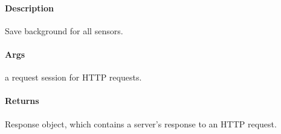 \documentclass[letterpaper,10pt,english]{sphinxmanual}
\begin{document}
\begin{fulllineitems}
\label{\detokenize{gemini_perception_API:gemini_perception_API.save_backgrounds}}
\pysigstartsignatures
{}
\pysigstopsignatures

\paragraph{Description}
\label{\detokenize{gemini_perception_API:id35}}
\sphinxAtStartPar
Save background for all sensors.


\paragraph{Args}
\label{\detokenize{gemini_perception_API:id36}}\begin{description}
\sphinxAtStartPar
a request session for HTTP requests.

\end{description}


\paragraph{Returns}
\label{\detokenize{gemini_perception_API:id37}}\begin{description}
\sphinxAtStartPar
Response object, which contains a server’s response to an HTTP request.

\end{description}

\end{fulllineitems}

\end{document}
